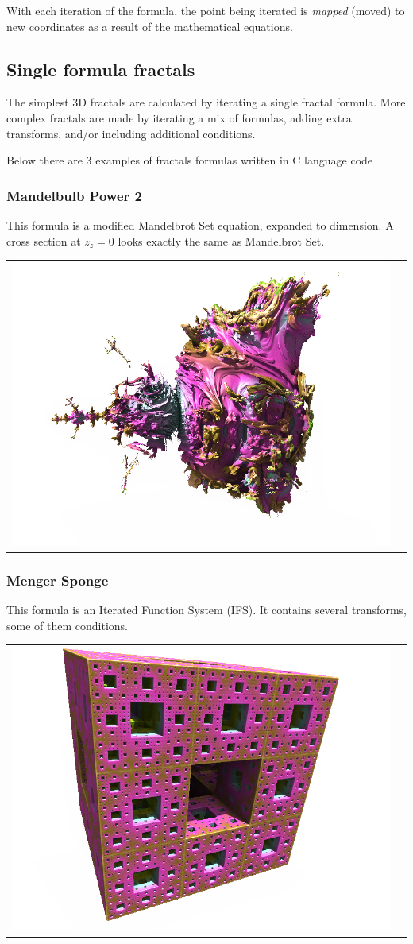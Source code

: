 With each iteration of the formula, the point being iterated is \emph{mapped} (moved) to new coordinates as a result of the mathematical equations.  

\subsection{Single formula fractals}\label{single-formula-fractals}

The simplest 3D fractals are calculated by iterating a single fractal formula. More complex fractals are made by iterating a mix of formulas, adding extra transforms, and/or including additional conditions. 

Below there are 3 examples of fractals formulas written in C language code

\subsubsection{Mandelbulb Power 2} \nopagebreak

This formula is a modified Mandelbrot Set equation, expanded to  dimension.
A cross section at $ z_z = 0 $ looks exactly the same as Mandelbrot Set.
\nopagebreak

\begin{tabular}{l l}
	\includegraphics[width=0.3\linewidth]{img/manual/media/formula_mandelbulb_power_2}	
	& 
	\begin{minipage}[b]{0.5\linewidth}
		
	\end{minipage}
\end{tabular} 

\subsubsection{Menger Sponge} \nopagebreak

This formula is an Iterated Function System (IFS). It contains several
transforms, some of them conditions. \nopagebreak

\begin{tabular}{l l}
	\includegraphics[width=0.3\linewidth]{img/manual/media/formula_menger_sponge.png}	
	& 
	\begin{minipage}[b]{0.5\linewidth}
		
	\end{minipage}
\end{tabular} 

